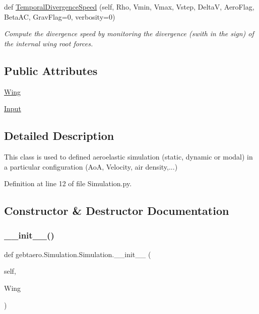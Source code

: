 \begin{DoxyCompactItemize}
def \hyperlink{classgebtaero_1_1_simulation_1_1_simulation_ac3dce2054614b2bbcac1bf97ab9e4ace}{Temporal\+Divergence\+Speed} (self, Rho, Vmin, Vmax, Vstep, DeltaV, Aero\+Flag, Beta\+AC, Grav\+Flag=0, verbosity=0)
\begin{DoxyCompactList}\small\item\em Compute the divergence speed by monitoring the divergence (swith in the sign) of the internal wing root forces. \end{DoxyCompactList}\end{DoxyCompactItemize}
\subsection*{Public Attributes}
\begin{DoxyCompactItemize}
\item 
\hyperlink{classgebtaero_1_1_simulation_1_1_simulation_a2900b07110293466d8ca5c75ef8e04f8}{Wing}
\item 
\hyperlink{classgebtaero_1_1_simulation_1_1_simulation_ad5005a77e6335eaefeec0af47edc46dc}{Input}
\end{DoxyCompactItemize}


\subsection{Detailed Description}
This class is used to defined aeroelastic simulation (static, dynamic or modal) in a particular configuration (AoA, Velocity, air density,...) 

Definition at line 12 of file Simulation.\+py.



\subsection{Constructor \& Destructor Documentation}
\mbox{\label{classgebtaero_1_1_simulation_1_1_simulation_a865b25fd48ff7aded232e634e28679c3}} 
\subsubsection{\texorpdfstring{\+\_\+\+\_\+init\+\_\+\+\_\+()}{\_\_init\_\_()}}
{\footnotesize\ttfamily def gebtaero.\+Simulation.\+Simulation.\+\_\+\+\_\+init\+\_\+\+\_\+ (\begin{DoxyParamCaption}\item[{}]{self,  }\item[{}]{Wing }\end{DoxyParamCaption})}



